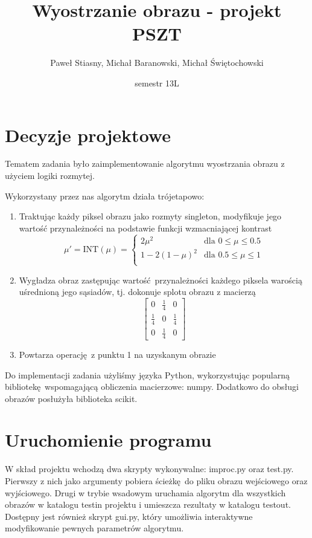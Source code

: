 \documentclass[a4paper,12pt]{article}
\begin{document}
\title{Wyostrzanie obrazu - projekt PSZT}
\date{semestr 13L}
\author{Paweł Stiasny, Michał Baranowski, Michał Świętochowski}
\maketitle

\section{Decyzje projektowe}
Tematem zadania było zaimplementowanie algorytmu wyostrzania obrazu
z użyciem logiki rozmytej.

Wykorzystany przez nas algorytm działa trójetapowo:
\begin{enumerate}
	\item Traktując każdy piksel obrazu jako rozmyty singleton, modyfikuje 
		jego wartość przynależności na podstawie funkcji wzmacniającej kontrast
		\[
			\mu' = \mbox{INT}(\mu) =
			\begin{cases}
				2 \mu^2 & \mbox{dla } 0 \leq \mu \leq 0.5 \\
				1 - 2(1 - \mu)^2  & \mbox{dla } 0.5 \leq \mu \leq 1 \\
			\end{cases}
		\]
	\item Wygładza obraz zastępując wartość przynależności każdego piksela
		warością uśrednioną jego sąsiadów, tj. dokonuje splotu obrazu
		z macierzą
		\[
			\begin{bmatrix}
				0 & \frac 1 4 & 0 \\
				\frac 1 4 & 0 & \frac 1 4 \\
				0 & \frac 1 4 & 0
			\end{bmatrix}
		\]
	\item Powtarza operację z punktu 1 na uzyskanym obrazie
\end{enumerate}

Do implementacji zadania użyliśmy języka Python, wykorzystując popularną
bibliotekę wspomagającą obliczenia macierzowe: numpy.  Dodatkowo do obsługi
obrazów posłużyła biblioteka scikit.

\section{Uruchomienie programu}
W skład projektu wchodzą dwa skrypty wykonywalne: improc.py oraz test.py.
Pierwszy z nich jako argumenty pobiera ścieżkę do pliku obrazu wejściowego
oraz wyjściowego.  Drugi w trybie wsadowym uruchamia algorytm dla wszystkich
obrazów w katalogu testin projektu i umieszcza rezultaty w katalogu testout.
Dostępny jest również skrypt gui.py, który umożliwia interaktywne modyfikowanie
pewnych parametrów algorytmu.
\end{document}

